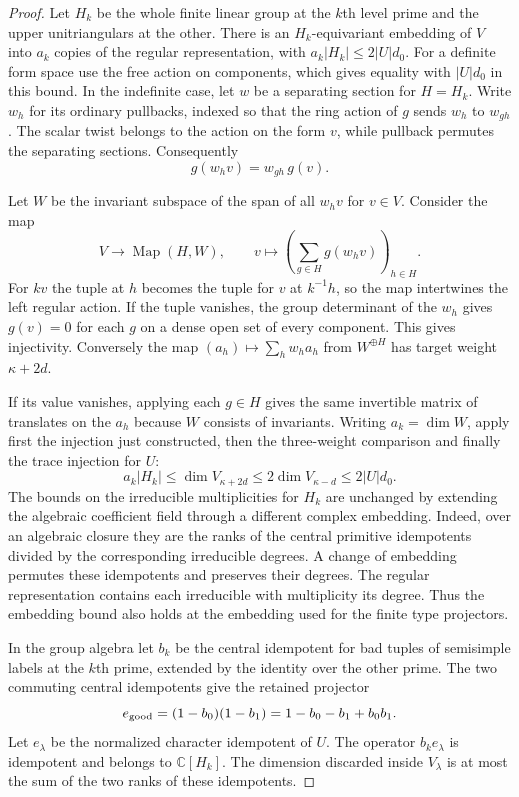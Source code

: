 \begin{proof}
Let $H_k$ be the whole finite linear group at the $k$th level
prime and the upper unitriangulars at the other. There is an
$H_k$-equivariant embedding of $V$ into $a_k$ copies of the
regular representation, with $a_k |H_k|\le 2|U|d_0$.
For a definite form space use the free action on components,
which gives equality with $|U|d_0$ in this bound. In the
indefinite case, let $w$ be a separating section for $H=H_k$.
Write $w_h$ for its ordinary pullbacks, indexed so that the
ring action of $g$ sends $w_h$ to $w_{gh}$. The scalar twist belongs to the action on the form \(v\), while pullback permutes the separating sections. Consequently
\[
  g(w_h v)=w_{gh}\,g(v).
\]

Let $W$ be the invariant subspace of the span of all $w_h v$
for $v\in V$. Consider the map
\[
 V\longrightarrow \operatorname{Map}(H,W),\qquad
 v\longmapsto
    \left(\sum_{g\in H}g(w_h v)\right)_{h\in H}.
\]
For $kv$ the tuple at $h$ becomes the tuple for $v$ at
$k^{-1}h$, so the map intertwines the left regular action.
If the tuple vanishes, the group determinant of the $w_h$
gives $g(v)=0$ for each $g$ on a dense open set of every
component. This gives injectivity. Conversely the map
$(a_h)\mapsto\sum_h w_h a_h$ from $W^{\oplus H}$ has target weight $\kappa+2d$.

If its value vanishes, applying each $g\in H$ gives the same
invertible matrix of translates on the $a_h$ because $W$
consists of invariants. Writing \(a_k=\dim W\), apply first the injection just constructed,
then the three-weight comparison and finally the trace injection for \(U\):
\[
 a_k|H_k|\le\dim V_{\kappa+2d}
 \le2\dim V_{\kappa-d}\le2|U|d_0 .
\]
The bounds on the irreducible multiplicities for $H_k$ are
unchanged by extending the algebraic coefficient field through
a different complex embedding. Indeed, over an algebraic
closure they are the ranks of the central primitive idempotents
divided by the corresponding irreducible degrees. A change of
embedding permutes these idempotents and preserves their degrees.
The regular representation contains each irreducible with
multiplicity its degree. Thus the embedding bound also holds
at the embedding used for the finite type projectors.
\label{cor:paired-good-share-1}

In the group algebra let $b_k$ be the central idempotent for
bad tuples of semisimple labels at the $k$th prime, extended
by the identity over the other prime. The two commuting central idempotents give the retained projector
\[
  e_{\rm good}=(1-b_0)(1-b_1)=1-b_0-b_1+b_0b_1.
\]
 Let $e_\lambda$
be the normalized character idempotent of $U$.
The operator $b_ke_\lambda$ is idempotent and belongs to
$\mathbb C[H_k]$. The dimension discarded inside $V_\lambda$
is at most the sum of the two ranks of these idempotents.


\end{proof}
